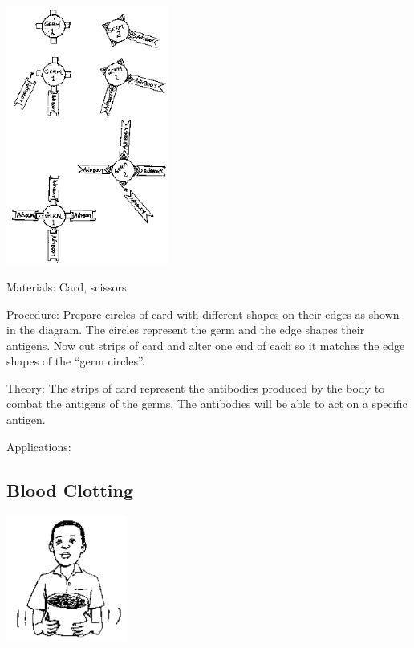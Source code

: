 \begin{multicols}{2}
\begin{center}
\includegraphics[width=0.4\textwidth]{./img/source/antibodies.png}
\end{center}

\begin{description*}
\item[Materials:]{Card, scissors}
\item[Procedure:]{Prepare circles of card with different shapes on their edges as shown in the diagram. The
circles represent the germ and the edge shapes their antigens. Now cut strips of card and
alter one end of each so it matches the edge shapes of the ``germ circles''.}
\item[Theory:]{The strips of card represent the antibodies produced by the body to combat the antigens of
the germs. The antibodies will be able to act on a specific antigen.}
\item[Applications:]{}
\end{description*}

\subsection{Blood Clotting} %

\begin{center}
\includegraphics[width=0.3\textwidth]{./img/source/blood-clots.png}
\end{center}


\end{multicols}
